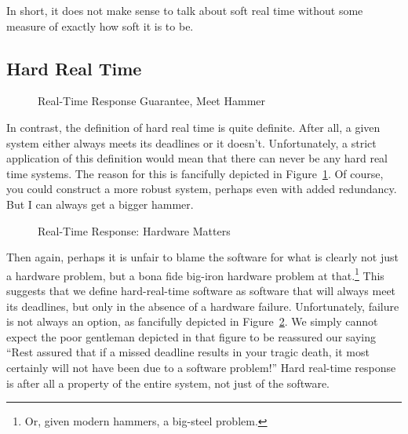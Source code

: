 In short, it does not make sense to talk about soft real time without
some measure of exactly how soft it is to be.

\subsection{Hard Real Time}
\label{sec:Hard Real Time}

\begin{figure}[bt]
\begin{center}
\end{center}
\caption{Real-Time Response Guarantee, Meet Hammer}
\label{fig:rt:Real-Time Response Guarantee, Meet Hammer}
\end{figure}

In contrast, the definition of hard real time is quite definite.
After all, a given system either always meets its deadlines or it
doesn't.
Unfortunately, a strict application of this definition would mean that
there can never be any hard real time systems.
The reason for this is fancifully depicted in
Figure~\ref{fig:rt:Real-Time Response Guarantee, Meet Hammer}.
Of course, you could construct a more robust system, perhaps even
with added redundancy.
But I can always get a bigger hammer.

\begin{figure}[bt]
\begin{center}
\end{center}
\caption{Real-Time Response: Hardware Matters}
\label{fig:rt:Real-Time Response: Hardware Matters}
\end{figure}

Then again, perhaps it is unfair to blame the software for what is clearly
not just a hardware problem, but a bona fide big-iron hardware problem
at that.\footnote{
	Or, given modern hammers, a big-steel problem.}
This suggests that we define hard-real-time software as software that
will always meet its deadlines, but only in the absence of a hardware
failure.
Unfortunately, failure is not always an option, as fancifully depicted in
Figure~\ref{fig:rt:Real-Time Response: Hardware Matters}.
We simply cannot expect the poor gentleman depicted in that figure to be
reassured our saying ``Rest assured that if a missed deadline results
in your tragic death, it most certainly will not have been due to a
software problem!''
Hard real-time response is after all a property of the entire system, not
just of the software.


